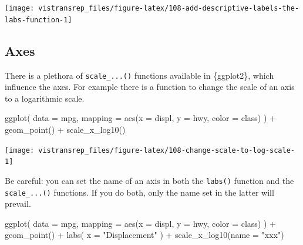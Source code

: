 \documentclass[]{book}
\newenvironment{Shaded}{}{}
\newcommand{\DataTypeTok}[1]{#1}
\newcommand{\KeywordTok}[1]{\textcolor[rgb]{0.00,0.00,1.00}{#1}}
\newcommand{\NormalTok}[1]{#1}
\newcommand{\OperatorTok}[1]{#1}
\newcommand{\StringTok}[1]{\textcolor[rgb]{0.00,0.50,0.50}{#1}}
\begin{document}
\begin{flushright}\texttt{[image: vistransrep\_files/figure-latex/108-add-descriptive-labels-the-labs-function-1]} \end{flushright}

\hypertarget{axes}{%
\subsection{Axes}\label{axes}}

There is a plethora of \texttt{scale\_...()} functions available in \{ggplot2\}, which influence the axes.
For example there is a function to change the scale of an axis to a logarithmic scale.

\begin{Shaded}
\begin{Highlighting}[]
\KeywordTok{ggplot}\NormalTok{(}
  \DataTypeTok{data =}\NormalTok{ mpg,}
  \DataTypeTok{mapping =} \KeywordTok{aes}\NormalTok{(}\DataTypeTok{x =}\NormalTok{ displ, }\DataTypeTok{y =}\NormalTok{ hwy, }\DataTypeTok{color =}\NormalTok{ class)}
\NormalTok{) }\OperatorTok{+}
\StringTok{  }\KeywordTok{geom_point}\NormalTok{() }\OperatorTok{+}
\StringTok{  }\KeywordTok{scale_x_log10}\NormalTok{()}
\end{Highlighting}
\end{Shaded}

\begin{flushright}\texttt{[image: vistransrep\_files/figure-latex/108-change-scale-to-log-scale-1]} \end{flushright}

Be careful: you can set the name of an axis in both the \texttt{labs()} function and the \texttt{scale\_...()} functions.
If you do both, only the name set in the latter will prevail.

\begin{Shaded}
\begin{Highlighting}[]
\KeywordTok{ggplot}\NormalTok{(}
  \DataTypeTok{data =}\NormalTok{ mpg,}
  \DataTypeTok{mapping =} \KeywordTok{aes}\NormalTok{(}\DataTypeTok{x =}\NormalTok{ displ, }\DataTypeTok{y =}\NormalTok{ hwy, }\DataTypeTok{color =}\NormalTok{ class)}
\NormalTok{) }\OperatorTok{+}
\StringTok{  }\KeywordTok{geom_point}\NormalTok{() }\OperatorTok{+}
\StringTok{  }\KeywordTok{labs}\NormalTok{(}
    \DataTypeTok{x =} \StringTok{"Displacement"}
\NormalTok{  ) }\OperatorTok{+}
\StringTok{  }\KeywordTok{scale_x_log10}\NormalTok{(}\DataTypeTok{name =} \StringTok{"xxx"}\NormalTok{)}
\end{Highlighting}
\end{Shaded}
\end{document}
